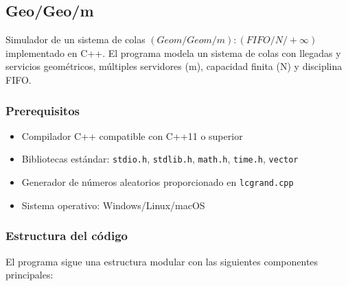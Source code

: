 \documentclass{article}
\begin{document}
\subsection{Geo/Geo/m}\label{subsec:geogeo_m}

Simulador de un sistema de colas $(Geom/Geom/m):(FIFO/N/+ \infty)$ implementado en C++. El programa modela un sistema de colas con llegadas y servicios geométricos, múltiples servidores (m), capacidad finita (N) y disciplina FIFO.

\subsubsection{Prerequisitos}

\begin{itemize}
    \item Compilador C++ compatible con C++11 o superior
    \item Bibliotecas estándar: \texttt{stdio.h}, \texttt{stdlib.h}, \texttt{math.h}, \texttt{time.h}, \texttt{vector}
    \item Generador de números aleatorios proporcionado en \texttt{lcgrand.cpp}
    \item Sistema operativo: Windows/Linux/macOS
\end{itemize}

\subsubsection{Estructura del código}

El programa sigue una estructura modular con las siguientes componentes principales:
\end{document}
